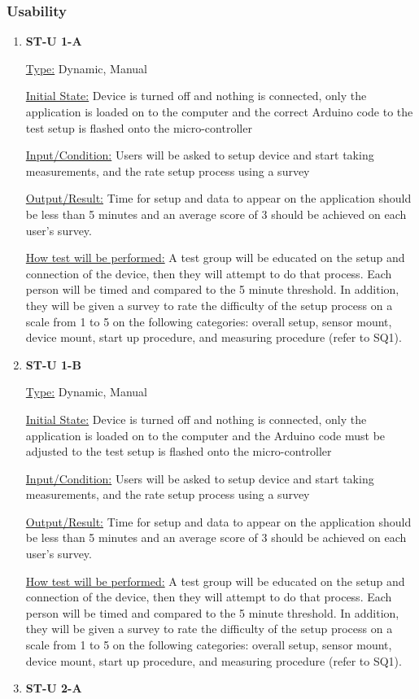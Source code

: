\documentclass[12pt, titlepage]{article}
\begin{document}
\subsubsection{Usability}

\begin{enumerate}
\item{\bf{ST-U 1-A}}

\underline{Type:} Dynamic, Manual
          
\underline{Initial State:} Device is turned off and nothing is connected, only the application is loaded on to the computer and the correct Arduino code to the test setup is flashed onto the micro-controller
          
\underline{Input/Condition:} Users will be asked to setup device and start taking measurements, and the rate setup process using a survey
          
\underline{Output/Result:} Time for setup and data to appear on the application should be less than 5 minutes and an average score of 3 should be achieved on each user's survey.
          
\underline{How test will be performed:} A test group will be educated on the setup and connection of the device, then they will attempt to do that process. 
Each person will be timed and compared to the 5 minute threshold. In addition, they will be given a survey to rate the difficulty of the setup process on a scale from 
1 to 5 on the following categories: overall setup, sensor mount, device mount, start up procedure, and measuring procedure (refer to SQ1).  
\item{\bf{ST-U 1-B}}

\underline{Type:} Dynamic, Manual
          
\underline{Initial State:} Device is turned off and nothing is connected, only the application is loaded on to the computer and the Arduino code must be adjusted to the test setup is flashed onto the micro-controller
          
\underline{Input/Condition:} Users will be asked to setup device and start taking measurements, and the rate setup process using a survey
          
\underline{Output/Result:} Time for setup and data to appear on the application should be less than 5 minutes and an average score of 3 should be achieved on each user's survey.
          
\underline{How test will be performed:} A test group will be educated on the setup and connection of the device, then they will attempt to do that process. 
Each person will be timed and compared to the 5 minute threshold. In addition, they will be given a survey to rate the difficulty of the setup process on a scale from 
1 to 5 on the following categories: overall setup, sensor mount, device mount, start up procedure, and measuring procedure (refer to SQ1).  
\item{\bf{ST-U 2-A}}


\end{enumerate}
\end{document}
